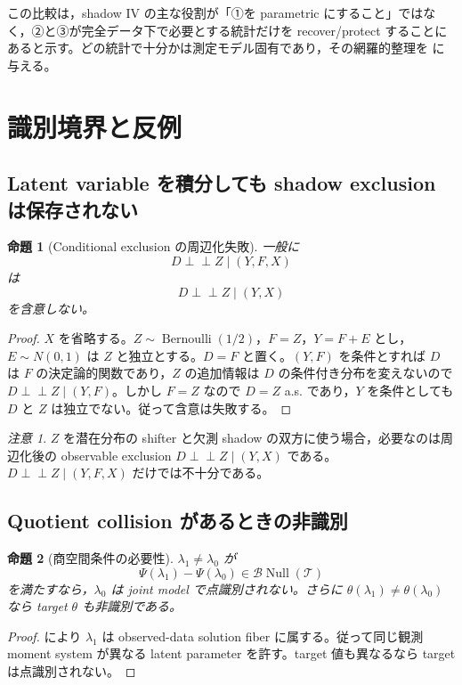 \documentclass[11pt,a4paper]{ltjsarticle}
\newtheorem{proposition}{命題}[section]
\theoremstyle{remark}
\newtheorem{remark}{注意}[section]
\newcommand{\ind}{\perp\!\!\!\perp}
\newcommand{\Top}{\mathscr T}
\newcommand{\Bop}{\mathscr B}
\newcommand{\Null}{\operatorname{Null}}
\begin{document}
この比較は，shadow IV の主な役割が「①を parametric にすること」ではなく，②と③が完全データ下で必要とする統計だけを recover/protect することにあると示す。どの統計で十分かは測定モデル固有であり，その網羅的整理を  に与える。

\section{識別境界と反例}\label{sec:boundary}

\subsection{Latent variable を積分しても shadow exclusion は保存されない}
\begin{proposition}[Conditional exclusion の周辺化失敗]\label{prop:marginalshadowfail}
一般に
\[
D\ind Z\mid(Y,F,X)
\]
は
\[
D\ind Z\mid(Y,X)
\]
を含意しない。
\end{proposition}

\begin{proof}
$X$ を省略する。$Z\sim\operatorname{Bernoulli}(1/2)$，$F=Z$，$Y=F+E$ とし，$E\sim N(0,1)$ は $Z$ と独立とする。$D=F$ と置く。$(Y,F)$ を条件とすれば $D$ は $F$ の決定論的関数であり，$Z$ の追加情報は $D$ の条件付き分布を変えないので $D\ind Z\mid(Y,F)$。しかし $F=Z$ なので $D=Z$ a.s. であり，$Y$ を条件としても $D$ と $Z$ は独立でない。従って含意は失敗する。
\end{proof}

\begin{remark}
$Z$ を潜在分布の shifter と欠測 shadow の双方に使う場合，必要なのは周辺化後の observable exclusion $D\ind Z\mid(Y,X)$ である。$D\ind Z\mid(Y,F,X)$ だけでは不十分である。
\end{remark}

\subsection{Quotient collision があるときの非識別}
\begin{proposition}[商空間条件の必要性]\label{prop:quotientnecessary}
$\lambda_1\neq\lambda_0$ が
\[
\Psi(\lambda_1)-\Psi(\lambda_0)\in\Bop\Null(\Top)
\]
を満たすなら，$\lambda_0$ は joint model で点識別されない。さらに $\theta(\lambda_1)\neq\theta(\lambda_0)$ なら target $\theta$ も非識別である。
\end{proposition}

\begin{proof}
により $\lambda_1$ は observed-data solution fiber に属する。従って同じ観測 moment system が異なる latent parameter を許す。target 値も異なるなら target は点識別されない。
\end{proof}
\end{document}
